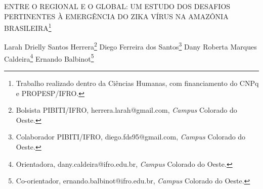 \documentclass[article,12pt,onesidea,4paper,english,brazil]{abntex2}
\begin{document}
	
	
	\frenchspacing 
	
	\begin{center}
		\LARGE ENTRE O REGIONAL E O GLOBAL: UM ESTUDO DOS DESAFIOS
		PERTINENTES À EMERGÊNCIA DO ZIKA VÍRUS NA AMAZÔNIA BRASILEIRA\footnote{Trabalho realizado dentro da Ciências Humanas, com financiamento do CNPq e PROPESP/IFRO.}
		
		\normalsize
		Larah Drielly Santos Herrera\footnote{Bolsista PIBITI/IFRO, herrera.larah@gmail.com, \textit{Campus} Colorado do Oeste.} 
		Diego Ferreira dos Santos\footnote{Colaborador PIBITI/IFRO, diego.fds95@gmail.com, \textit{Campus} Colorado do Oeste.} 
		Dany Roberta Marques Caldeira\footnote{Orientadora, dany.caldeira@ifro.edu.br, \textit{Campus} Colorado do Oeste.} 
		Ernando Balbinot\footnote{Co-orientador, ernando.balbinot@ifro.edu.br, \textit{Campus} Colorado do Oeste.} 
	\end{center}
	
\end{document}
